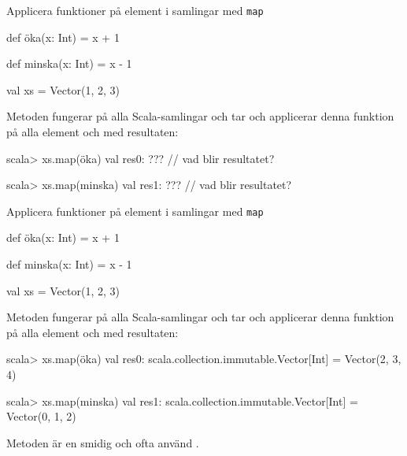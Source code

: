 \begin{Slide}{Applicera funktioner på element i samlingar med \texttt{map}}\SlideFontSmall
\begin{Code}
def öka(x: Int) = x + 1

def minska(x: Int) = x - 1

val xs = Vector(1, 2, 3)
\end{Code}
\pause
Metoden  fungerar på alla Scala-samlingar och tar  och applicerar denna funktion på alla element och  med resultaten:
\begin{REPL}
scala> xs.map(öka)
val res0: ???   // vad blir resultatet?

scala> xs.map(minska)
val res1: ???   // vad blir resultatet?
\end{REPL}
\end{Slide}


\begin{Slide}{Applicera funktioner på element i samlingar med \texttt{map}}\SlideFontSmall
\begin{Code}
def öka(x: Int) = x + 1

def minska(x: Int) = x - 1

val xs = Vector(1, 2, 3)
\end{Code}
Metoden  fungerar på alla Scala-samlingar och tar  och applicerar denna funktion på alla element och  med resultaten:
\begin{REPL}
scala> xs.map(öka)
val res0: scala.collection.immutable.Vector[Int] = Vector(2, 3, 4)

scala> xs.map(minska)
val res1: scala.collection.immutable.Vector[Int] = Vector(0, 1, 2)
\end{REPL}
Metoden  är en smidig och ofta använd .
\end{Slide}


